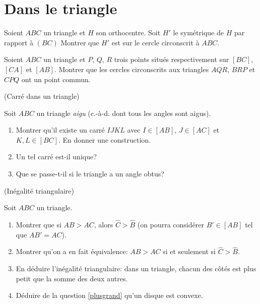 \documentclass[a4paper,11pt,reqno]{amsart}
\begin{document}
\section{Dans le triangle}

\begin{exo}

  Soient $ABC$ un triangle et $H$  son orthocentre. Soit $H'$ le symétrique de $H$ par rapport à $(BC)$ Montrer que $H'$ est sur le cercle circonscrit à $ABC$.
\end{exo}

\begin{exo}

  Soient $ABC$ un triangle et $P$, $Q$, $R$ trois points situés respectivement sur $[BC]$, $[CA]$ et $[AB]$. Montrer que les cercles circonscrits aux triangles $AQR$, $BRP$ et $CPQ$ ont un point commun.
\end{exo}


\begin{exo} (Carré dans un  triangle)

  Soit $ABC$ un triangle \emph{aigu} (c.-à-d. dont tous les angles sont aigus).
  \begin{enumerate}
    \item Montrer qu'il existe un carré $IJKL$ avec $I \in [AB]$, $J \in [AC]$ et $K,L \in [BC]$. En donner une construction.
    \item Un tel carré est-il unique?
    \item Que se passe-t-il si le triangle a un angle obtus?
  \end{enumerate}
\end{exo}

\begin{exo} (Inégalité triangulaire)

  Soit $ABC$ un triangle.
  \begin{enumerate}
    \item \label{plusgrand} Montrer que si $AB > AC$, alors $\widehat{C}>\widehat{B}$ (on pourra considérer $B' \in [AB]$ tel que $AB'=AC$). %
    \item Montrer qu'on a en fait équivalence: $AB>AC$ si et seulement si $\widehat{C}>\widehat{B}$.
    \item En déduire l'inégalité triangulaire: dans un triangle, chacun des côtés est plus petit que la somme des deux autres.
    \item Déduire de la question \ref{plusgrand} qu'un disque est convexe.
  \end{enumerate}
\end{exo}
\end{document}
